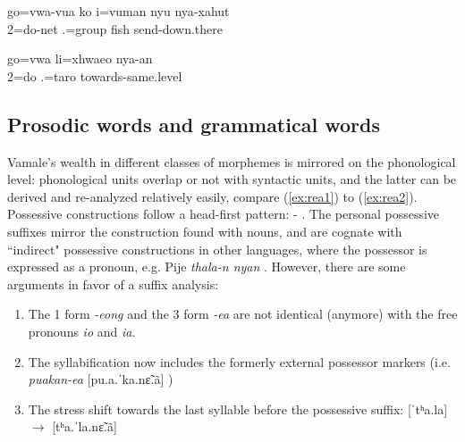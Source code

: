 \ea \label{ex:vwa_ko}
\gll go\textsubscript{}=vwa-vua ko {\ob}i=vuman nyu{\cb}\textsubscript{} nya-xahut\\
 2=do-net  .=group fish send-down.there\\
\glt {}
\z

\ea \label{ex:vwa_ref}
\gll go\textsubscript{}=vwa li=xhwaeo\textsubscript{} nya-an\\
 2=do .=taro towards-same.level\\
\glt {}
\z

\subsection{Prosodic words and grammatical words}

Vamale's wealth in different classes of morphemes is mirrored on the phonological level: phonological units overlap or not with syntactic units, and the latter can be derived and re-analyzed relatively easily, compare (\ref{ex:rea1}) to (\ref{ex:rea2}). %
Possessive constructions follow a head-first pattern: - . The personal possessive suffixes mirror the construction found with nouns, and are cognate with ``indirect" possessive constructions in other languages, where the possessor is expressed as a pronoun, e.g. Pije \textit{thala-n nyan}  \parencite[248]{haudricourt_dictionnaire_1982}. However, there are some arguments in favor of a suffix analysis: 
\begin{enumerate}
	\sloppy
	\item The 1 form \textit{-eong} and the 3 form \textit{-ea} are not identical (anymore) with the free pronouns \textit{io} and \textit{ia}.
	\item The syllabification now includes the formerly external possessor markers (i.e. \textit{puakan-ea} [pu.a.ˈka.nɛ̃.ã] )
	\item The stress shift towards the last syllable before the possessive suffix: [ˈtʰa.la]  $\rightarrow$ [tʰa.ˈla.nɛ̃.ã] 
\end{enumerate}


